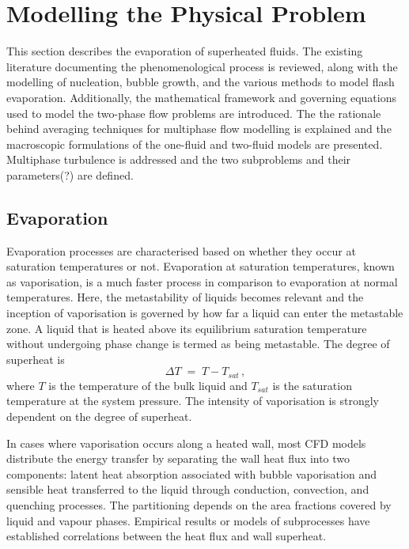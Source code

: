 \section{Modelling the Physical Problem}
This section describes the evaporation of superheated fluids. The existing literature
 documenting the phenomenological process is reviewed, along with the modelling
 of nucleation, bubble growth, and the various methods to model flash evaporation.
 Additionally,  the mathematical framework and governing equations used to model the two-phase flow problems are introduced.
 The the rationale behind averaging techniques for multiphase flow modelling is explained and the 
 macroscopic formulations of the one-fluid and two-fluid models are presented. 
 Multiphase turbulence is addressed and the two subproblems and their parameters(?)
 are defined. 


\subsection{Evaporation}
Evaporation processes are characterised based on whether they occur at saturation
 temperatures or not. Evaporation at saturation temperatures, known as vaporisation, is a much
 faster process in comparison to evaporation at normal temperatures. 
 Here, the metastability of liquids becomes relevant and the inception of vaporisation
 is governed by how far a liquid can enter the metastable zone. A liquid that is heated 
 above its equilibrium saturation temperature without undergoing phase change 
 is termed as being metastable. The degree of superheat is 
 \begin{equation}
  \Delta T \;=\; T - T_{sat}\,,
 \end{equation}
 where $T$ is the temperature of the bulk liquid and $T_{sat}$ is the 
 saturation temperature at the system pressure. The intensity of vaporisation
 is strongly dependent on the degree of superheat.~\cite{wickertSimulation, pinhasiModelingFlashingTwoPhase2005}

In cases where vaporisation occurs along a heated wall, most CFD models distribute the energy 
 transfer by separating the wall heat flux into two components: 
 latent heat absorption associated with bubble vaporisation and 
 sensible heat transferred to the liquid through conduction, 
 convection, and quenching processes. The partitioning depends on 
 the area fractions covered by liquid and vapour phases.
 Empirical results or models of subprocesses have 
 established correlations between the heat flux and wall superheat.~\cite{gilmanDevelopmentGeneralPurpose2014,ghiaasiaanTwoPhaseFlowBoiling2007} 

